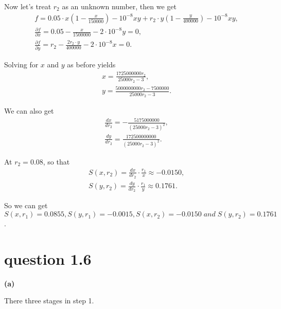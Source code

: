 \documentclass{report}
\begin{document}
\vspace{0.5em}
\par 
Now let's treat $r_2$ as an unknown number, then we get
\begin{align*}
    &f=0.05 \cdot x(1-\frac{x}{150000})-10^{-8} xy + r_2\cdot y(1-\frac{y}{400000})-10^{-8} xy,\\
    &\frac{\partial f}{\partial x}=0.05 -\frac{x}{1500000}-2\cdot 10^{-8}y=0,\\
    &\frac{\partial f}{\partial y}=r_2-\frac{2r_2\cdot y}{400000}-2\cdot 10^{-8}x=0.
\end{align*}
\par
Solving for $x$ and $y$ as before yields
\begin{align*}
    &x=\frac{1725000000r_2}{25000r_2 -3},\\
    &y=\frac{5000000000r_2-7500000}{25000r_2 -3}.
\end{align*}
\par We can also get
\begin{align*}
    &\frac{dx}{dr_2}=-\frac{5175000000}{{(25000r_2 -3)}^2},\\
    &\frac{dy}{dr_2}=\frac{172500000000}{{(25000r_2 -3)}^2}.
\end{align*}
\par At $r_2 = 0.08$, so that 
\begin{align*}
    &S(x,r_2)=\frac{dx}{dr_2}\cdot \frac{r_1}{x}\approx -0.0150,\\
    &S(y,r_2)=\frac{dy}{dr_2}\cdot \frac{r_1}{y}\approx 0.1761.
\end{align*}
\par So we can get $S(x,r_1)=0.0855, S(y,r_1)=-0.0015, S(x,r_2)=-0.0150\; and\; S(y,r_2)=0.1761$.

\newpage
\section*{question 1.6} 
{\bf (a)}\par

\hspace{-1.5em}{\bf Step 1. Ask the question}\par 
There three stages in step 1.
\end{document}
